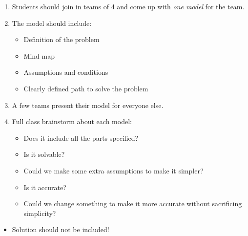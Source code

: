 \begin{annotation}
\begin{goals}
	\begin{enumerate}[label=\textbf{\color{Cerulean}\arabic*.}]
		\item Students should join in teams of 4 and come up with \emph{one model} for the team.
		\item The model should include:
		\begin{itemize}
			\item Definition of the problem
			\item Mind map
			\item Assumptions and conditions
			\item Clearly defined path to solve the problem
		\end{itemize}
		\item A few teams present their model for everyone else. 
		\item Full class brainstorm about each model:
		\begin{itemize}
			\item Does it include all the parts specified?
			\item Is it solvable? 
			\item Could we make some extra assumptions to make it simpler?
			\item Is it accurate?
			\item Could we change something to make it more accurate without sacrificing simplicity?
		\end{itemize}
	\end{enumerate}
\end{goals}	
\begin{notes}
\begin{itemize}
	\item Solution should not be included!
\end{itemize}	
\end{notes}
\end{annotation}


















\standardonlynewpage


%
%



